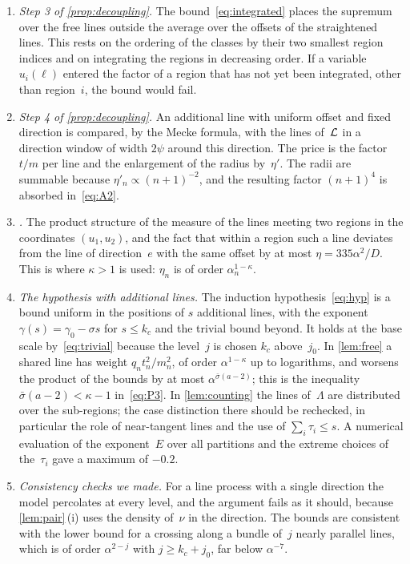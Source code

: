 \documentclass[11pt,letterpaper]{article}
\begin{document}
\begin{enumerate}
  \item \emph{Step 3 of \cref{prop:decoupling}.} The bound~\eqref{eq:integrated} places the supremum over the free lines outside the average over the offsets of the straightened lines. This rests on the ordering of the classes by their two smallest region indices and on integrating the regions in decreasing order. If a variable $u_i(\ell)$ entered the factor of a region that has not yet been integrated, other than region~$i$, the bound would fail.
  \item \emph{Step 4 of \cref{prop:decoupling}.} An additional line with uniform offset and fixed direction is compared, by the Mecke formula, with the lines of~$\mathcal L$ in a direction window of width $2\psi$ around this direction. The price is the factor $t/m$ per line and the enlargement of the radius by~$\eta'$. The radii are summable because $\eta'_n\propto(n+1)^{-2}$, and the resulting factor $(n+1)^4$ is absorbed in~\eqref{eq:A2}.
  \item \emph{.} The product structure of the measure of the lines meeting two regions in the coordinates $(u_1,u_2)$, and the fact that within a region such a line deviates from the line of direction~$e$ with the same offset by at most $\eta=335\alpha^2/D$. This is where $\kappa>1$ is used: $\eta_n$ is of order $\alpha_n^{1-\kappa}$.
  \item \emph{The hypothesis with additional lines.} The induction hypothesis~\eqref{eq:hyp} is a bound uniform in the positions of $s$ additional lines, with the exponent $\gamma(s)=\gamma_0-\sigma s$ for $s\le k_c$ and the trivial bound beyond. It holds at the base scale by~\eqref{eq:trivial} because the level~$j$ is chosen $k_c$ above~$j_0$. In \cref{lem:free} a shared line has weight $q_nt_n^2/m_n^2$, of order $\alpha^{1-\kappa}$ up to logarithms, and worsens the product of the bounds by at most $\alpha^{\bar\sigma(a-2)}$; this is the inequality $\bar\sigma(a-2)<\kappa-1$ in~\eqref{eq:P3}. In \cref{lem:counting} the lines of~$\Lambda$ are distributed over the sub-regions; the case distinction there should be rechecked, in particular the role of near-tangent lines and the use of $\sum_i\tau_i\le s$. A numerical evaluation of the exponent~$E$ over all partitions and the extreme choices of the~$\tau_i$ gave a maximum of $-0.2$.
  \item \emph{Consistency checks we made.} For a line process with a single direction the model percolates at every level, and the argument fails as it should, because \cref{lem:pair}\,(i) uses the density of~$\nu$ in the direction. The bounds are consistent with the lower bound for a crossing along a bundle of~$j$ nearly parallel lines, which is of order $\alpha^{2-j}$ with $j\ge k_c+j_0$, far below $\alpha^{-7}$.
\end{enumerate}
\end{document}
